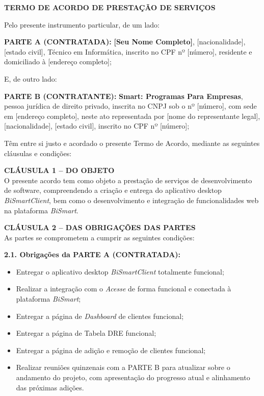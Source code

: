 \documentclass[12pt, a4paper]{article}
\begin{document}
\onehalfspacing

\begin{center}
    \textbf{\Large TERMO DE ACORDO DE PRESTAÇÃO DE SERVIÇOS}
\end{center}

\vspace{1cm}

Pelo presente instrumento particular, de um lado:

\textbf{PARTE A (CONTRATADA):} \textbf{[Seu Nome Completo]}, [nacionalidade], [estado civil], Técnico em Informática, inscrito no CPF nº [número], residente e domiciliado à [endereço completo];

E, de outro lado:

\textbf{PARTE B (CONTRATANTE):} \textbf{Smart: Programas Para Empresas}, pessoa jurídica de direito privado, inscrita no CNPJ sob o nº [número], com sede em [endereço completo], neste ato representada por [nome do representante legal], [nacionalidade], [estado civil], inscrito no CPF nº [número];

Têm entre si justo e acordado o presente Termo de Acordo, mediante as seguintes cláusulas e condições:

\vspace{0.5cm}
\noindent\textbf{CLÁUSULA 1 -- DO OBJETO} \\
O presente acordo tem como objeto a prestação de serviços de desenvolvimento de software, compreendendo a criação e entrega do aplicativo desktop \textit{BiSmartClient}, bem como o desenvolvimento e integração de funcionalidades web na plataforma \textit{BiSmart}.

\vspace{0.5cm}
\noindent\textbf{CLÁUSULA 2 -- DAS OBRIGAÇÕES DAS PARTES} \\
As partes se comprometem a cumprir as seguintes condições:

\textbf{2.1. Obrigações da PARTE A (CONTRATADA):}
\begin{itemize}
    \item Entregar o aplicativo desktop \textit{BiSmartClient} totalmente funcional;
    \item Realizar a integração com o \textit{Acesse} de forma funcional e conectada à plataforma \textit{BiSmart};
    \item Entregar a página de \textit{Dashboard} de clientes funcional;
    \item Entregar a página de Tabela DRE funcional;
    \item Entregar a página de adição e remoção de clientes funcional;
    \item Realizar reuniões quinzenais com a PARTE B para atualizar sobre o andamento do projeto, com apresentação do progresso atual e alinhamento das próximas adições.
\end{itemize}
\end{document}
